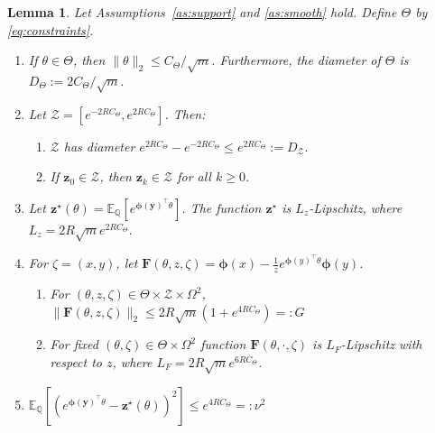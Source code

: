 \documentclass[twoside]{article}
\newtheorem{lemma}{Lemma}
\theoremstyle{definition}
\newcommand{\E}{\mathbb{E}}
\newcommand{\Q}{\mathbb{Q}}
\newcommand{\cZ}{\mathcal{Z}}
\newcommand{\1}[1]{\scalebox{1.25}{$\mathds{1}$}\left[#1\right]}
\begin{document}
\begin{lemma}
\label{lem:constants}
Let Assumptions~\ref{as:support} and \ref{as:smooth} hold.
Define $\Theta$ by \eqref{eq:constraints}.
\begin{enumerate}
\item  \label{it:DTheta}
If $\theta\in \Theta$, then $\|\theta\|_2\le C_{\Theta}/\sqrt{m}$. Furthermore, the diameter of $\Theta$ is $D_{\Theta}:=2C_{\Theta}/\sqrt{m}.$
\item \label{it:DZ}
Let $\cZ=[e^{-2RC_{\Theta}},e^{2RC_{\Theta}}]$. Then:
\begin{enumerate}
\item  $\cZ$ has  diameter  $e^{2RC_{\Theta}}-e^{-2RC_{\Theta}}\le e^{2RC_{\Theta}}:=D_{\cZ}.$
\item  If $\bm{z}_0\in \cZ$, then $\bm{z}_k\in \cZ$ for all $k\ge 0$.
\end{enumerate}
\item \label{it:zStarLipschitz}
Let $\bm{z}^\star(\theta)=\E_{\Q}[e^{\bm{\phi}(\bm{y})^\top \theta}]$. The function $\bm{z}^\star$ is $L_z$-Lipschitz, where $L_z=2R\sqrt{m}e^{2RC_{\Theta}}.$
\item \label{it:FLipschitz}
For $\zeta=(x,y)$, let $\bm{F}(\theta,z,\zeta)=\bm{\phi}(x)-\frac{1}{z}e^{\bm{\phi}(y)^\top \theta}\bm{\phi}(y)$. 
\begin{enumerate}
\item   For $(\theta,z,\zeta)\in \Theta\times\cZ\times \Omega^2$,  $\|\bm{F}(\theta,z,\zeta)\|_2\le 2R\sqrt{m}(1+e^{4RC_{\Theta}})=:G$
    \item For fixed $(\theta,\zeta)\in \Theta\times \Omega^2$ function $\bm{F}(\theta,\cdot,\zeta)$ is $L_F$-Lipschitz with respect to $z$, where $L_F=2R\sqrt{m}e^{6RC_{\Theta}}$.
\end{enumerate}
\item  \label{it:variance} 
$\E_{\Q}\left[\left(e^{\bm{\phi}(\bm{y})^\top \theta} - \bm{z}^\star(\theta)\right)^2 \right]\le e^{4R C_{\Theta}}=:\nu^2$
\end{enumerate}
\end{lemma}
\end{document}

